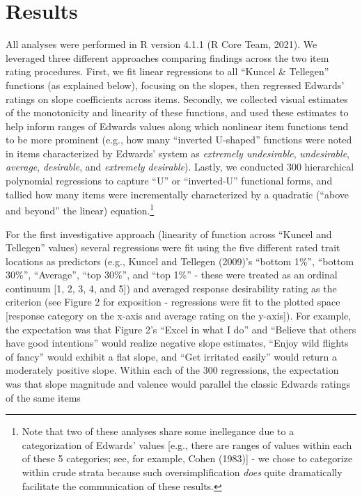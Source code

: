 \documentclass[
  ,man]{apa6}
\begin{document}
\hypertarget{results}{%
\section{Results}\label{results}}

All analyses were performed in R version 4.1.1 (R Core Team, 2021). We leveraged three different approaches comparing findings across the two item rating procedures. First, we fit linear regressions to all ``Kuncel \& Tellegen'' functions (as explained below), focusing on the slopes, then regressed Edwards' ratings on slope coefficients across items. Secondly, we collected visual estimates of the monotonicity and linearity of these functions, and used these estimates to help inform ranges of Edwards values along which nonlinear item functions tend to be more prominent (e.g., how many ``inverted U-shaped'' functions were noted in items characterized by Edwards' system as \emph{extremely undesirable}, \emph{undesirable}, \emph{average}, \emph{desirable}, and \emph{extremely desirable}). Lastly, we conducted 300 hierarchical polynomial regressions to capture ``U'' or ``inverted-U'' functional forms, and tallied how many items were incrementally characterized by a quadratic (``above and beyond'' the linear) equation.\footnote{Note that two of these analyses share some inellegance due to a categorization of Edwards' values {[}e.g., there are ranges of values within each of these 5 categories; see, for example, Cohen (1983){]} - we chose to categorize within crude strata because such oversimplification \emph{does} quite dramatically facilitate the communication of these results.}

For the first investigative approach (linearity of function across ``Kuncel and Tellegen'' values) several regressions were fit using the five different rated trait locations as predictors (e.g., Kuncel and Tellegen (2009)'s ``bottom 1\%'', ``bottom 30\%'', ``Average'', ``top 30\%'', and ``top 1\%'' - these were treated as an ordinal continuum {[}1, 2, 3, 4, and 5{]}) and averaged response desirability rating as the criterion (see Figure 2 for exposition - regressions were fit to the plotted space {[}response category on the x-axis and average rating on the y-axis{]}). For example, the expectation was that Figure 2's ``Excel in what I do'' and ``Believe that others have good intentions'' would realize negative slope estimates, ``Enjoy wild flights of fancy'' would exhibit a flat slope, and ``Get irritated easily'' would return a moderately positive slope. Within each of the 300 regressions, the expectation was that slope magnitude and valence would parallel the classic Edwards ratings of the same items
\end{document}
